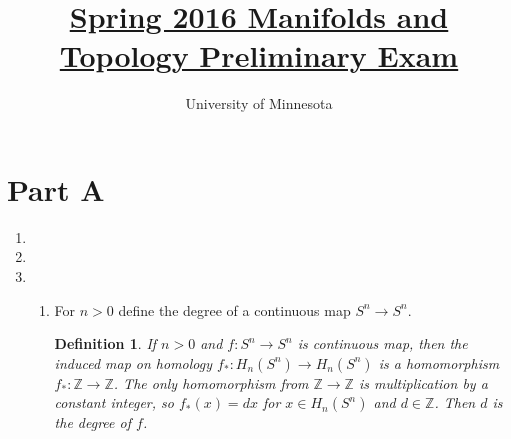 \documentclass{article}
\title{\href{https://math.umn.edu/sites/math.umn.edu/files/exams/mantops16.pdf}{Spring 2016 Manifolds and Topology Preliminary Exam}}
\author{University of Minnesota}
\date{}
\newtheorem*{definition}{Definition}
\begin{document}
\maketitle

\section*{Part A}
\begin{enumerate}
	\item 
%		
%		
%		
%		
%		
%	
	\item
	
	\item 
		\begin{enumerate}
		
		\item For $n >0$ define the degree of a continuous map $S^n \rightarrow S^n$.
		\begin{definition}
		If $n>0$ and $f:S^n \rightarrow S^n$ is continuous map, then the induced map on homology
		$f_*: H_n(S^n) \rightarrow H_n(S^n)$ is a homomorphism
		$f_*: \mathbb{Z} \rightarrow \mathbb{Z}$.
		The only homomorphism from $\mathbb{Z} \rightarrow \mathbb{Z}$ is multiplication by a constant
		integer, so $f_*(x) = dx$ for $x \in H_n(S^n)$ and $d \in \mathbb{Z}$.
		Then $d$ is the degree of $f$.
		\end{definition}
		

\end{enumerate}
\end{enumerate}
\end{document}
